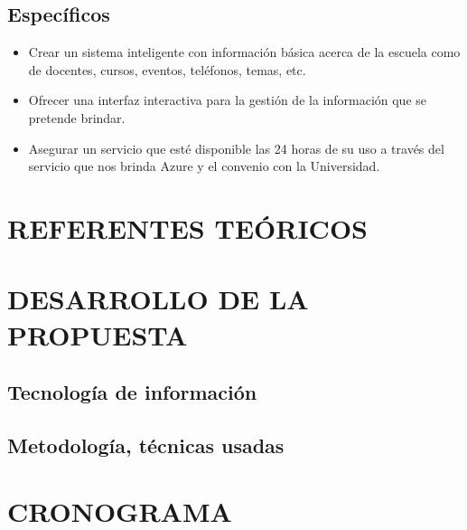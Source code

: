\documentclass[12pt,letterpaper]{article}
\begin{document}
	\subsection{Específicos}
\begin{itemize}
	\item Crear un sistema inteligente con información básica acerca de la escuela como de docentes, cursos, eventos, teléfonos, temas, etc.
	\item Ofrecer una interfaz interactiva para la gestión de la información que se pretende brindar.
	\item Asegurar un servicio que esté disponible las 24 horas de su uso a través del servicio que nos brinda Azure y el convenio con la Universidad.
\end{itemize}



\section{REFERENTES TEÓRICOS}


\section{DESARROLLO DE LA PROPUESTA}
	\subsection{Tecnología de información}
	\subsection{Metodología, técnicas usadas}

\section{CRONOGRAMA}



\cite{1}


\end{document}
